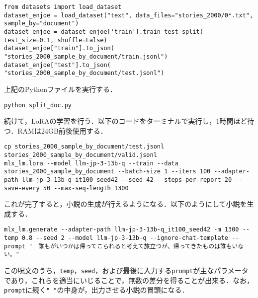 \documentclass[10pt, a5paper, twoside]{jsarticle}
\theoremstyle{definition}
\begin{document}
		\begin{mdframed}
			\begin{verbatim}
from datasets import load_dataset
dataset_enjoe = load_dataset("text", data_files="stories_2000/0*.txt", sample_by="document")
dataset_enjoe = dataset_enjoe['train'].train_test_split( test_size=0.1, shuffle=False)
dataset_enjoe["train"].to_json( "stories_2000_sample_by_document/train.jsonl")
dataset_enjoe["test"].to_json( "stories_2000_sample_by_document/test.jsonl")
			\end{verbatim}
		\end{mdframed}

		上記のPythonファイルを実行する．

		\begin{mdframed}
			\begin{verbatim}
python split_doc.py
			\end{verbatim}
		\end{mdframed}

	続けて，LoRAの学習を行う．以下のコードをターミナルで実行し，1時間ほど待つ．RAMは24GB前後使用する．

		\begin{mdframed}
			\begin{verbatim}
cp stories_2000_sample_by_document/test.jsonl stories_2000_sample_by_document/valid.jsonl 
mlx_lm.lora --model llm-jp-3-13b-q --train --data stories_2000_sample_by_document --batch-size 1 --iters 100 --adapter-path llm-jp-3-13b-q_it100_seed42 --seed 42 --steps-per-report 20 --save-every 50 --max-seq-length 1300
			\end{verbatim}
		\end{mdframed}

	これが完了すると，小説の生成が行えるようになる．以下のようにして小説を生成する．

		\begin{mdframed}
			\begin{verbatim}
mlx_lm.generate --adapter-path llm-jp-3-13b-q_it100_seed42 -m 1300 --temp 0.8 --seed 2 --model llm-jp-3-13b-q --ignore-chat-template --prompt "　誰もがいつかは帰ってこられると考えて旅立つが、帰ってきたものは誰もいない。"
			\end{verbatim}
		\end{mdframed}

		この呪文のうち，\texttt{temp}，\texttt{seed}，および最後に入力する\texttt{prompt}が主なパラメータであり，これらを適当にいじることで，無数の差分を得ることが出来る．なお，\texttt{prompt}に続く\texttt{" "}の中身が，出力させる小説の冒頭になる．
\end{document}
